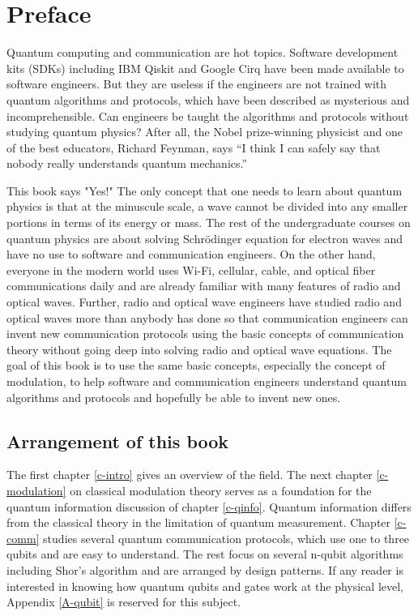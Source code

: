 \documentclass[oneside, letter, 12pt]{book}
\begin{document}



\chapter*{Preface}
Quantum computing and communication are hot topics. Software development kits (SDKs) including IBM Qiskit and Google Cirq have been made available to software engineers. But they are useless if the engineers are not trained with quantum algorithms and protocols, which have been described as mysterious and incomprehensible. Can engineers be taught the algorithms and protocols without studying quantum physics? After all, the Nobel prize-winning physicist and one of the best educators, Richard Feynman, says “I think I can safely say that nobody really understands quantum mechanics.”

This book says "Yes!" The only concept that one needs to learn about quantum physics is that at the minuscule scale, a wave cannot be divided into any smaller portions in terms of its energy or mass. The rest of the undergraduate courses on quantum physics are about solving Schrödinger equation for electron waves and have no use to software and communication engineers. On the other hand, everyone in the modern world uses Wi-Fi, cellular, cable, and optical fiber communications daily and are already familiar with many features of radio and optical waves. Further, radio and optical wave engineers have studied radio and optical waves more than anybody has done so that communication engineers can invent new communication protocols using the basic concepts of communication theory without going deep into solving radio and optical wave equations. The goal of this book is to use the same basic concepts, especially the concept of modulation, to help software and communication engineers understand quantum algorithms and protocols and hopefully be able to invent new ones.

\section{Arrangement of this book}
The first chapter \ref{c-intro} gives an overview of the field. The next chapter \ref{c-modulation} on classical modulation theory serves as a foundation for the quantum information discussion of chapter \ref{c-qinfo}. Quantum information differs from the classical theory in the limitation of quantum measurement. Chapter \ref{c-comm} studies several quantum communication protocols, which use one to three qubits and are easy to understand. The rest focus on several n-qubit algorithms including Shor's algorithm and are arranged by design patterns. If any reader is interested in knowing how quantum qubits and gates work at the physical level, Appendix \ref{A-qubit} is reserved for this subject.
\end{document}
